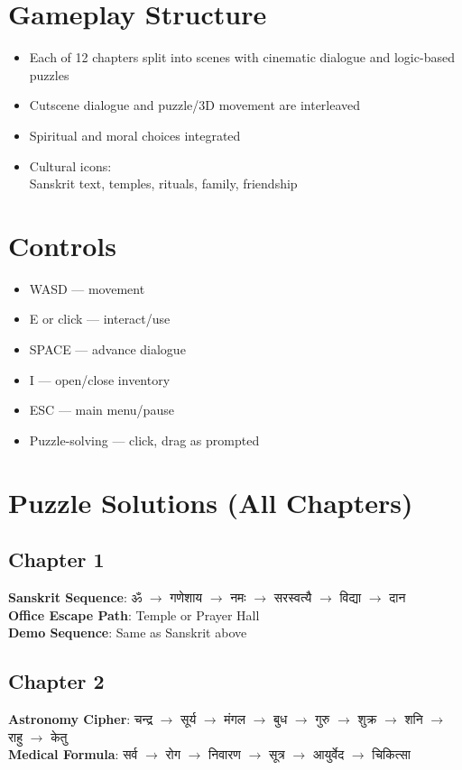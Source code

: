 \documentclass[12pt]{article}
\begin{document}
\section{Gameplay Structure}
\begin{itemize}[leftmargin=1.5em]
  \item Each of 12 chapters split into scenes with cinematic dialogue and logic-based puzzles
  \item Cutscene dialogue and puzzle/3D movement are interleaved
  \item Spiritual and moral choices integrated
  \item Cultural icons:\\ Sanskrit text, temples, rituals, family, friendship
\end{itemize}

\section{Controls}
\begin{itemize}[leftmargin=1.5em]
  \item WASD --- movement
  \item E or click --- interact/use
  \item SPACE --- advance dialogue
  \item I --- open/close inventory
  \item ESC --- main menu/pause
 \item Puzzle-solving --- click, drag as prompted
\end{itemize}

\section{Puzzle Solutions (All Chapters)}
\subsection*{Chapter 1}
\textbf{Sanskrit Sequence}: ॐ $\rightarrow$ गणेशाय $\rightarrow$ नमः $\rightarrow$ सरस्वत्यै $\rightarrow$ विद्या $\rightarrow$ दान\\
\textbf{Office Escape Path}: Temple or Prayer Hall\\
\textbf{Demo Sequence}: Same as Sanskrit above

\subsection*{Chapter 2}
\textbf{Astronomy Cipher}: चन्द्र $\rightarrow$ सूर्य $\rightarrow$ मंगल $\rightarrow$ बुध $\rightarrow$ गुरु $\rightarrow$ शुक्र $\rightarrow$ शनि $\rightarrow$ राहु $\rightarrow$ केतु\\
\textbf{Medical Formula}: सर्व $\rightarrow$ रोग $\rightarrow$ निवारण $\rightarrow$ सूत्र $\rightarrow$ आयुर्वेद $\rightarrow$ चिकित्सा
\end{document}
